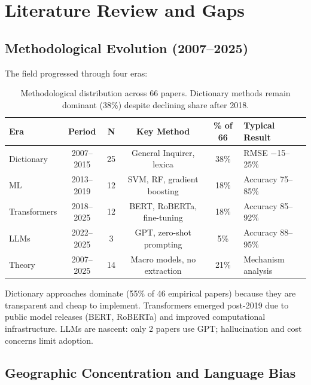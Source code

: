 \documentclass[11pt]{article}
\begin{document}
\section{Literature Review and Gaps}

\subsection{Methodological Evolution (2007--2025)}

The field progressed through four eras:

\begin{table}[H]
\centering
\begin{tabular}{lccccl}
\toprule
\textbf{Era} & \textbf{Period} & \textbf{N} & \textbf{Key Method} & \textbf{\% of 66} & \textbf{Typical Result} \\
\midrule
Dictionary & 2007--2015 & 25 & General Inquirer, lexica & 38\% & RMSE $-$15--25\% \\
ML & 2013--2019 & 12 & SVM, RF, gradient boosting & 18\% & Accuracy 75--85\% \\
Transformers & 2018--2025 & 12 & BERT, RoBERTa, fine-tuning & 18\% & Accuracy 85--92\% \\
LLMs & 2022--2025 & 3 & GPT, zero-shot prompting & 5\% & Accuracy 88--95\% \\
Theory & 2007--2025 & 14 & Macro models, no extraction & 21\% & Mechanism analysis \\
\bottomrule
\end{tabular}
\caption{Methodological distribution across 66 papers. Dictionary methods remain dominant (38\%) despite declining share after 2018.}
\end{table}

Dictionary approaches dominate (55\% of 46 empirical papers) because they are transparent and cheap to implement. Transformers emerged post-2019 due to public model releases (BERT, RoBERTa) and improved computational infrastructure. LLMs are nascent: only 2 papers use GPT; hallucination and cost concerns limit adoption.

\subsection{Geographic Concentration and Language Bias}
\end{document}
